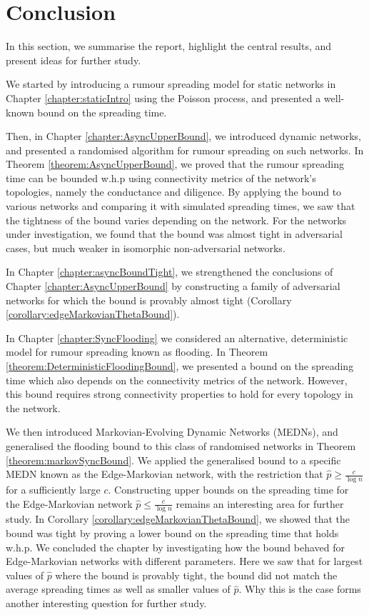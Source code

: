 \chapter{Conclusion}\label{chapter:conclusion}

In this section, we summarise the report, highlight the central results, and present ideas for further study.

We started by introducing a rumour spreading model for static networks in Chapter \ref{chapter:staticIntro} using the Poisson process, and presented a well-known bound on the spreading time. 

Then, in Chapter \ref{chapter:AsyncUpperBound}, we introduced dynamic networks, and presented a randomised algorithm for rumour spreading on such networks. In Theorem \ref{theorem:AsyncUpperBound}, we proved that the rumour spreading time can be bounded w.h.p using connectivity metrics of the network's topologies, namely the conductance and diligence. By applying the bound to various networks and comparing it with simulated spreading times, we saw that the tightness of the bound varies depending on the network. For the networks under investigation, we found that the bound was almost tight in adversarial cases, but much weaker in isomorphic non-adversarial networks. 

In Chapter \ref{chapter:asyncBoundTight}, we strengthened the conclusions of Chapter \ref{chapter:AsyncUpperBound} by constructing a family of adversarial networks for which the bound is provably almost tight (Corollary \ref{corollary:edgeMarkovianThetaBound}).

In Chapter \ref{chapter:SyncFlooding} we considered an alternative, deterministic model for rumour spreading known as flooding. In Theorem \ref{theorem:DeterministicFloodingBound}, we presented a bound on the spreading time which also depends on the connectivity metrics of the network. 
However, this bound requires strong connectivity properties to hold for every topology in the network.

We then introduced Markovian-Evolving Dynamic Networks (MEDNs), and generalised the flooding bound to this class of randomised networks in Theorem \ref{theorem:markovSyncBound}. We applied the generalised bound to a specific MEDN known as the Edge-Markovian network, with the restriction that $\hat{p} \geq \frac{c}{\log n}$ for a sufficiently large $c$. Constructing upper bounds on the spreading time for the Edge-Markovian network $\hat{p} \leq \frac{c}{\log n}$ remains an interesting area for further study. In Corollary \ref{corollary:edgeMarkovianThetaBound}, we showed that the bound was tight by proving a lower bound on the spreading time that holds w.h.p. We concluded the chapter by investigating how the bound behaved for Edge-Markovian networks with different parameters. Here we saw that for largest values of $\hat{p}$ where the bound is provably tight, the bound did not match the average spreading times as well as smaller values of $\hat{p}$. Why this is the case forms another interesting question for further study.

